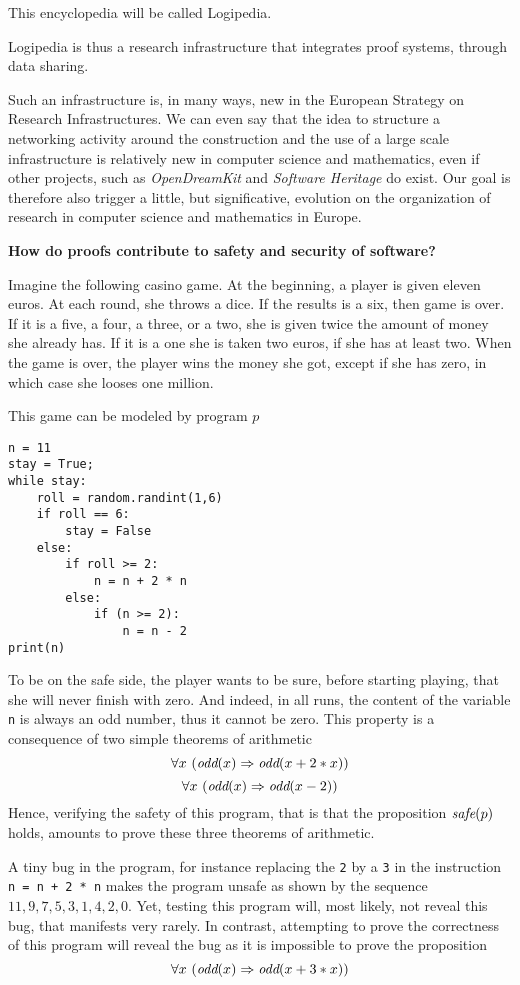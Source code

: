 This encyclopedia will be called Logipedia.

Logipedia is thus a research infrastructure that integrates proof
systems, through data sharing.

Such an infrastructure is, in many ways, new in the European Strategy
on Research Infrastructures. We can even say that the idea to
structure a networking activity around the construction and the use
of a large scale infrastructure is relatively new in computer science and
mathematics, even if other projects, such as {\em OpenDreamKit} and
{\em Software Heritage} do exist. Our goal is therefore also trigger a
little, but significative, evolution on the organization of research
in computer science and mathematics in Europe.

\begin{framed}
\begin{center}
{\bf \Large How do proofs contribute to safety and security of software?}
\end{center}
  
Imagine the following casino game. At the beginning, a player is given
eleven euros. At each round, she throws a dice. If the results is a
six, then game is over.  If it is a five, a four, a three, or a two,
she is given twice the amount of money she already has. If it is a one
she is taken two euros, if she has at least two.  When the game is
over, the player wins the money she got, except if she has zero, in
which case she looses one million.

This game can be modeled by program $p$
\begin{verbatim}
n = 11
stay = True;
while stay: 
    roll = random.randint(1,6)
    if roll == 6:
        stay = False
    else:
        if roll >= 2:
            n = n + 2 * n
        else:
            if (n >= 2):
                n = n - 2
print(n)
\end{verbatim}

To be on the safe side, the player wants to be sure, before starting
playing, that she will never finish with zero.  And indeed, in all runs,
the content of the variable {\tt n} is always an odd number, thus it
cannot be zero. This property is a consequence of two simple
theorems of arithmetic
$$\forall x~(\mbox{\it odd}(x) \Rightarrow \mbox{\it odd}(x + 2 * x))$$
$$\forall x~(\mbox{\it odd}(x) \Rightarrow \mbox{\it odd}(x - 2))$$
Hence, verifying the safety of this program, that is that the
proposition 
${\mbox{\it safe}}(p)$ holds, 
amounts to prove these three theorems of arithmetic.

A tiny bug in the program, for instance replacing the {\tt 2} by a
{\tt 3} in the instruction {\tt n = n + 2 * n} makes the program unsafe
as shown by the sequence $11, 9, 7, 5, 3, 1, 4, 2, 0$. Yet, testing
this program will, most likely, not reveal this bug, that manifests
very rarely.  In contrast, attempting to prove the correctness of this
program will
reveal the bug as it is impossible to prove the proposition
$$\forall x~(\mbox{\it odd}(x) \Rightarrow \mbox{\it odd}(x + 3 * x))$$
\end{framed}
